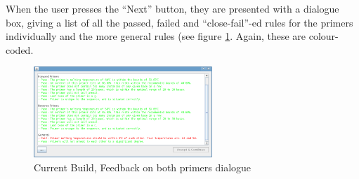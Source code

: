 When the user presses the ``Next'' button, they are presented with a
dialogue box, giving a list of all the passed, failed and
``close-fail''-ed rules for the primers individually and the more
general rules (see figure \ref{fig:currentBuild:primerDesignBothFeedback}.
Again, these are colour-coded.

\begin{figure}[h]
  \begin{center}
    \includegraphics[width=0.6\textwidth]{./images/currentBuild/primerDesignBothFeedback.png}
    \caption{
      \label{fig:currentBuild:primerDesignBothFeedback}
      Current Build, Feedback on both primers dialogue
    }
  \end{center}
\end{figure}
